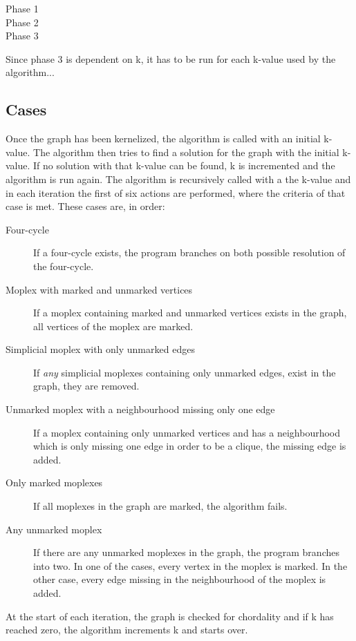 \documentclass{article}
\begin{document}
		\begin{description}
			\item[Phase 1]
			\item[Phase 2]
			\item[Phase 3]
		\end{description}

		Since phase 3 is dependent on k, it has to be run for each k-value used by the algorithm...

		\subsection{Cases} 
		Once the graph has been kernelized, the algorithm is called with an initial k-value. The algorithm then tries to find a solution for the graph with the initial k-value.
		If no solution with that k-value can be found, k is incremented and the algorithm is run again.
		The algorithm is recursively called with a the k-value and in each iteration the first of six actions are performed, where the criteria of that case is met.
		These cases are, in order:
		\begin{description}
			\item[Four-cycle] If a four-cycle exists, the program branches on both possible resolution of the four-cycle.
			\item[Moplex with marked and unmarked vertices] If a moplex containing marked and unmarked vertices exists in the graph, all vertices of the moplex are marked.
			\item[Simplicial moplex with only unmarked edges] If \emph{any} simplicial moplexes containing only unmarked edges, exist in the graph, they are removed.
			\item[Unmarked moplex with a neighbourhood missing only one edge] If a moplex containing only unmarked vertices and has a neighbourhood which is only missing one edge in order to be a clique, the missing edge is added.
			\item[Only marked moplexes] If all moplexes in the graph are marked, the algorithm fails.
			\item[Any unmarked moplex] If there are any unmarked moplexes in the graph, the program branches into two. In one of the cases, every vertex in the moplex is marked. In the other case, every edge missing in the neighbourhood of the moplex is added.
		\end{description}

		At the start of each iteration, the graph is checked for chordality and if k has reached zero, the algorithm increments k and starts over.
\end{document}
